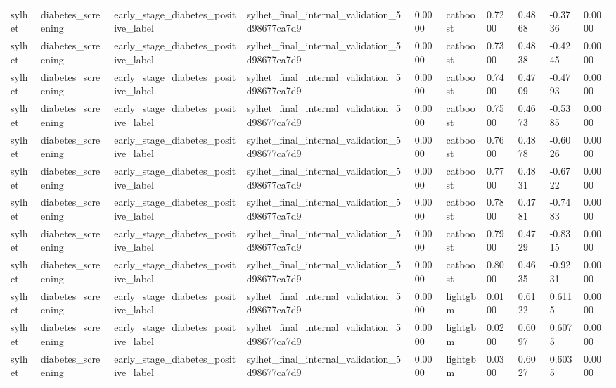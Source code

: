 \begin{tabular}{llllllllll}
sylhet & diabetes\_screening & early\_stage\_diabetes\_positive\_label & sylhet\_final\_internal\_validation\_5d98677ca7d9 & 0.0000 & catboost & 0.7200 & 0.4868 & -0.3736 & 0.0000 \\
sylhet & diabetes\_screening & early\_stage\_diabetes\_positive\_label & sylhet\_final\_internal\_validation\_5d98677ca7d9 & 0.0000 & catboost & 0.7300 & 0.4838 & -0.4245 & 0.0000 \\
sylhet & diabetes\_screening & early\_stage\_diabetes\_positive\_label & sylhet\_final\_internal\_validation\_5d98677ca7d9 & 0.0000 & catboost & 0.7400 & 0.4709 & -0.4793 & 0.0000 \\
sylhet & diabetes\_screening & early\_stage\_diabetes\_positive\_label & sylhet\_final\_internal\_validation\_5d98677ca7d9 & 0.0000 & catboost & 0.7500 & 0.4673 & -0.5385 & 0.0000 \\
sylhet & diabetes\_screening & early\_stage\_diabetes\_positive\_label & sylhet\_final\_internal\_validation\_5d98677ca7d9 & 0.0000 & catboost & 0.7600 & 0.4878 & -0.6026 & 0.0000 \\
sylhet & diabetes\_screening & early\_stage\_diabetes\_positive\_label & sylhet\_final\_internal\_validation\_5d98677ca7d9 & 0.0000 & catboost & 0.7700 & 0.4831 & -0.6722 & 0.0000 \\
sylhet & diabetes\_screening & early\_stage\_diabetes\_positive\_label & sylhet\_final\_internal\_validation\_5d98677ca7d9 & 0.0000 & catboost & 0.7800 & 0.4781 & -0.7483 & 0.0000 \\
sylhet & diabetes\_screening & early\_stage\_diabetes\_positive\_label & sylhet\_final\_internal\_validation\_5d98677ca7d9 & 0.0000 & catboost & 0.7900 & 0.4729 & -0.8315 & 0.0000 \\
sylhet & diabetes\_screening & early\_stage\_diabetes\_positive\_label & sylhet\_final\_internal\_validation\_5d98677ca7d9 & 0.0000 & catboost & 0.8000 & 0.4635 & -0.9231 & 0.0000 \\
sylhet & diabetes\_screening & early\_stage\_diabetes\_positive\_label & sylhet\_final\_internal\_validation\_5d98677ca7d9 & 0.0000 & lightgbm & 0.0100 & 0.6122 & 0.6115 & 0.0000 \\
sylhet & diabetes\_screening & early\_stage\_diabetes\_positive\_label & sylhet\_final\_internal\_validation\_5d98677ca7d9 & 0.0000 & lightgbm & 0.0200 & 0.6097 & 0.6075 & 0.0000 \\
sylhet & diabetes\_screening & early\_stage\_diabetes\_positive\_label & sylhet\_final\_internal\_validation\_5d98677ca7d9 & 0.0000 & lightgbm & 0.0300 & 0.6027 & 0.6035 & 0.0000 \\

\end{tabular}
